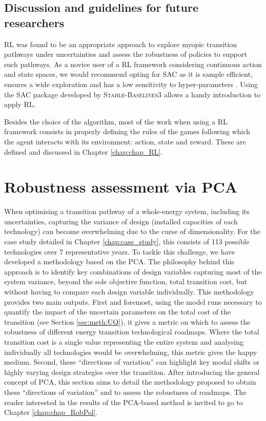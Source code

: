 \subsection{Discussion and guidelines for future researchers}
\label{subsec:meth:RL:discussion}
\acrfull{RL} was found to be an appropriate approach to explore myopic transition pathways under uncertainties and assess the robustness of policies to support such pathways. As a novice user of a \gls{RL} framework considering continuous action and state spaces, we would recommend opting for \gls{SAC} as it is sample efficient, ensures a wide exploration and has a low sensitivity to hyper-parameters \cite{haarnoja2018soft}. Using the \gls{SAC} package developed by \textsc{Stable-Baselines3} allows a handy introduction to apply \gls{RL}. 

Besides the choice of the algorithm, most of the work when using a \gls{RL} framework consists in properly defining the rules of the games following which the agent interacts with its environment: action, state and reward. These are defined and discussed in Chapter \ref{chap:chap_RL}.

\section{Robustness assessment via PCA}
\label{sec:meth:PCA}
When optimising a transition pathway of a whole-energy system, including its uncertainties, capturing the variance of design (\ie installed capacities of each technology) can become overwhelming due to the curse of dimensionality. For the case study detailed in Chapter \ref{chap:case_study}, this consists of 113 possible technologies over 7 representative years. To tackle this challenge, we have developed a methodology based on the \acrfull{PCA}. The philosophy behind this approach is to identify key combinations of design variables capturing most of the system variance, beyond the sole objective function, \ie total transition cost, but without having to compare each design variable individually. This methodology provides two main outputs. First and foremost, using the model runs necessary to quantify the impact of the uncertain parameters on the total cost of the transition (see Section \ref{sec:meth:UQ}), it gives a metric on which to assess the robustness of different energy transition technological roadmaps. Where the total transition cost is a single value representing the entire system and analysing individually all technologies would be overwhelming, this metric gives the happy medium. Second, these ``directions of variation'' can highlight key modal shifts or highly varying design strategies over the transition. After introducing the general concept of \gls{PCA}, this section aims to detail the methodology proposed to obtain these ``directions of variation'' and to assess the robustness of roadmaps. The reader interested in the results of the \gls{PCA}-based method is invited to go to Chapter \ref{chap:chap_RobPol}.

